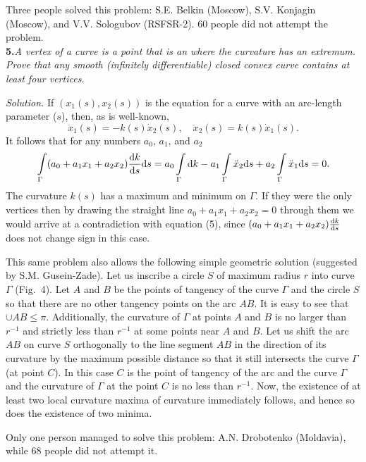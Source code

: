 \documentclass[12pt]{amsart}
\begin{document}
Three people solved this problem: S.E. Belkin (Moscow), S.V. Konjagin (Moscow),
and V.V. Sologubov (RSFSR-2).
60 people did not attempt the problem.\\

\textbf{5.}\quad\textit{A vertex of a curve is a point that is an where the
curvature has an extremum.
Prove that any smooth (infinitely differentiable) closed convex curve contains
at least four vertices.}

\textit{Solution.}
If $(x_1(s),x_2(s))$ is the equation for a curve with an arc-length parameter
($s$), then, as is well-known,
$$\ddot x_1(s)=-k(s)\dot x_2(s),\quad\ddot x_2(s)=k(s)\dot x_1(s).$$
It follows that for any numbers $a_0$, $a_1$, and $a_2$
\begin{equation}
\int\limits_\Gamma(a_0+a_1x_1+a_2x_2)\frac{\text dk}{\text ds}\text ds=
a_0\int\limits_\Gamma\text dk-a_1\int\limits_\Gamma\ddot x_2\text ds+
a_2\int\limits_\Gamma\ddot x_1\text ds=0.
\end{equation}
The curvature $k(s)$ has a maximum and minimum on $\Gamma$.
If they were the only vertices then by drawing the straight line
$a_0+a_1x_1+a_2x_2=0$ through them we would arrive at a contradiction with
equation (5), since $(a_0+a_1x_1+a_2x_2)\frac{\text dk}{\text ds}$ does not
change sign in this case.

This same problem also allows the following simple geometric solution (suggested
by S.M. Gusein-Zade).
Let us inscribe a circle $S$ of maximum radius $r$ into curve $\Gamma$ (Fig.~4).
Let $A$ and $B$ be the points of tangency of the curve $\Gamma$ and the circle
$S$ so that there are no other tangency points on the arc $AB$.
It is easy to see that $\cup AB\leq\pi$.
Additionally, the curvature of $\Gamma$ at points $A$ and $B$ is no larger than
$r^{-1}$ and strictly less than $r^{-1}$ at some points near $A$ and
$B$.
Let us shift the arc $AB$ on curve $S$ orthogonally to the line segment
$AB$ in the direction of its curvature by the maximum possible distance so that it
still intersects the curve $\Gamma$ (at point $C$).
In this case $C$ is the point of tangency of the arc and the curve $\Gamma$ and the
curvature of $\Gamma$ at the point $C$ is no less than $r^{-1}$.
Now, the existence of at least two local curvature maxima of curvature immediately
follows, and hence so does the existence of two minima.

Only one person managed to solve this problem: A.N. Drobotenko (Moldavia), while
68 people did not attempt it.\\
\end{document}
